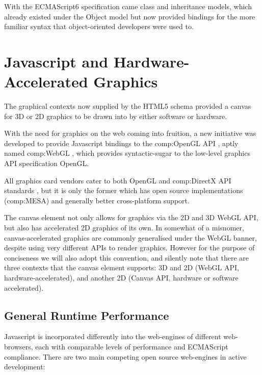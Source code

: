 With the ECMAScript6 specification came class and inheritance models, which already existed under the Object model but now provided bindings for the more familiar syntax that object-oriented developers were used to.


\section{Javascript and Hardware-Accelerated Graphics}

The graphical contexts now supplied by the HTML5 schema provided a canvas for 3D or 2D graphics to be drawn into by either software or hardware.

With the need for graphics on the web coming into fruition, a new initiative was developed to provide Javascript bindings to the \gls{comp:OpenGL} API \cite{opengl}, aptly named \gls{comp:WebGL} \cite{webgl}, which provides syntactic-sugar to the low-level graphics API specification OpenGL.

All graphics card vendors cater to both OpenGL and \gls{comp:DirectX} API standards \cite{directx}, but it is only the former which has open source implementations (\gls{comp:MESA}) and generally better cross-platform support. 

The canvas element not only allows for graphics via the 2D and 3D WebGL API, but also has accelerated 2D graphics of its own. In somewhat of a misnomer, canvas-accelerated graphics are commonly generalised under the WebGL banner, despite using very different APIs to render graphics. However for the purpose of conciseness we will also adopt this convention, and silently note that there are three contexts that the canvas element supports: 3D and 2D (WebGL API, hardware-accelerated), and another 2D (Canvas API, hardware or software accelerated).

\subsection{General Runtime Performance}

Javascript is incorporated differently into the web-engines of different web-browsers, each with comparable levels of performance and ECMAScript compliance. There are two main competing open source web-engines in active development:

\begin{description}
\end{description}

